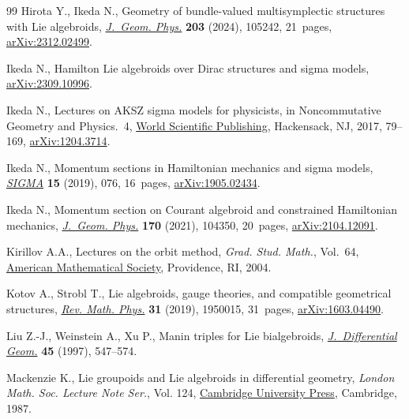 \documentclass[pdftex]{sigma}
\numberwithin{equation}{section}
\begin{document}
\begin{thebibliography}{99}
Hirota Y., Ikeda N., Geometry of bundle-valued multisymplectic structures with
 {L}ie algebroids, \href{https://doi.org/10.1016/j.geomphys.2024.105242}{\textit{J.~Geom. Phys.}} \textbf{203} (2024), 105242,
 21~pages, \href{https://arxiv.org/abs/2312.02499}{arXiv:2312.02499}.

Ikeda N., Hamilton {L}ie algebroids over {D}irac structures and sigma models,
 \href{https://arxiv.org/abs/2309.10996}{arXiv:2309.10996}.

Ikeda N., Lectures on {AKSZ} sigma models for physicists, in Noncommutative
 {G}eometry and {P}hysics.~4, \href{https://doi.org/10.1142/9789813144613_0003}{World Scientific Publishing}, Hackensack, NJ,
 2017, 79--169, \href{https://arxiv.org/abs/1204.3714}{arXiv:1204.3714}.

Ikeda N., Momentum sections in {H}amiltonian mechanics and sigma models,
 \href{https://doi.org/10.3842/SIGMA.2019.076}{\textit{SIGMA}} \textbf{15} (2019), 076, 16~pages, \href{https://arxiv.org/abs/1905.02434}{arXiv:1905.02434}.

Ikeda N., Momentum section on {C}ourant algebroid and constrained {H}amiltonian
 mechanics, \href{https://doi.org/10.1016/j.geomphys.2021.104350}{\textit{J.~Geom. Phys.}} \textbf{170} (2021), 104350, 20~pages,
 \href{https://arxiv.org/abs/2104.12091}{arXiv:2104.12091}.

Kirillov A.A., Lectures on the orbit method, \textit{Grad. Stud. Math.},
 Vol.~64, \href{https://doi.org/10.1090/gsm/064}{American Mathematical Society}, Providence, RI, 2004.

Kotov A., Strobl T., Lie algebroids, gauge theories, and compatible geometrical
 structures, \href{https://doi.org/10.1142/S0129055X19500156}{\textit{Rev. Math. Phys.}} \textbf{31} (2019), 1950015, 31~pages,
 \href{https://arxiv.org/abs/1603.04490}{arXiv:1603.04490}.

Liu Z.-J., Weinstein A., Xu P., Manin triples for {L}ie bialgebroids,
 \href{https://doi.org/10.4310/jdg/1214459842}{\textit{J.~Differential Geom.}} \textbf{45} (1997), 547--574.

Mackenzie K., Lie groupoids and {L}ie algebroids in differential geometry,
 \textit{London Math. Soc. Lecture Note Ser.}, Vol. 124, \href{https://doi.org/10.1017/CBO9780511661839}{Cambridge University
 Press}, Cambridge, 1987.


\end{thebibliography}
\end{document}
